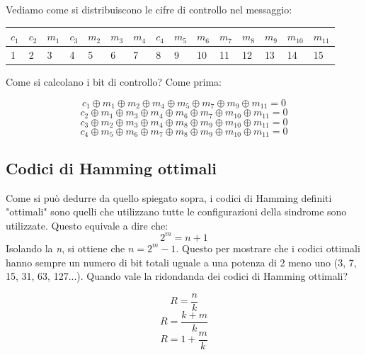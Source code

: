 Vediamo come si distribuiscono le cifre di controllo nel messaggio:

\begin{table}[h]
	\centering
	\begin{tabular}{|l|l|l|l|l|l|l|l|l|l|l|l|l|l|l|}
		\hline
		$c_1$ & $c_2$ & $m_1$ & $c_3$ & $m_2$ & $m_3$ & $m_4$ & $c_4$ & $m_5$ & $m_6$ & $m_7$ & $m_8$ & $m_9$ & $m_{10}$ & $m_{11}$ \\
		\hline
		1   & 2   & 3   & 4   & 5   & 6   & 7   & 8   & 9   & 10  & 11  & 12  & 13  & 14   & 15  \\
		\hline
	\end{tabular}
\end{table}

Come si calcolano i bit di controllo? Come prima:

\begin{equation*}
c_1 \oplus m_1 \oplus m_2 \oplus m_4 \oplus m_5 \oplus m_7 \oplus m_9 \oplus m_{11} = 0
\end{equation*}
\begin{equation*}
c_2 \oplus m_1 \oplus m_3 \oplus m_4 \oplus m_6 \oplus m_7 \oplus m_{10} \oplus m_{11} = 0
\end{equation*}
\begin{equation*}
c_3 \oplus m_2 \oplus m_3 \oplus m_4 \oplus m_8 \oplus m_9 \oplus m_{10} \oplus m_{11} = 0
\end{equation*}
\begin{equation*}
c_4 \oplus m_5 \oplus m_6 \oplus m_7 \oplus m_8 \oplus m_9 \oplus m_{10} \oplus m_{11} = 0
\end{equation*}

\subsection*{Codici di Hamming ottimali}
Come si può dedurre da quello spiegato sopra, i codici di Hamming definiti "ottimali" sono quelli che utilizzano tutte le configurazioni della sindrome sono utilizzate.
Questo equivale a dire che:
\begin{equation}
2^m=n+1
\end{equation}
Isolando la \textit{n}, si ottiene che $n = 2^m-1$. Questo per mostrare che i codici ottimali hanno sempre un numero di bit totali uguale a una potenza di 2 meno uno (3, 7, 15, 31, 63, 127...).
Quando vale la ridondanda dei codici di Hamming ottimali?

\begin{equation}
R = \frac{n}{k}
\end{equation}
\begin{equation*}
R = \frac{k+m}{k}
\end{equation*}
\begin{equation*}
R = 1 + \frac{m}{k}
\end{equation*}

